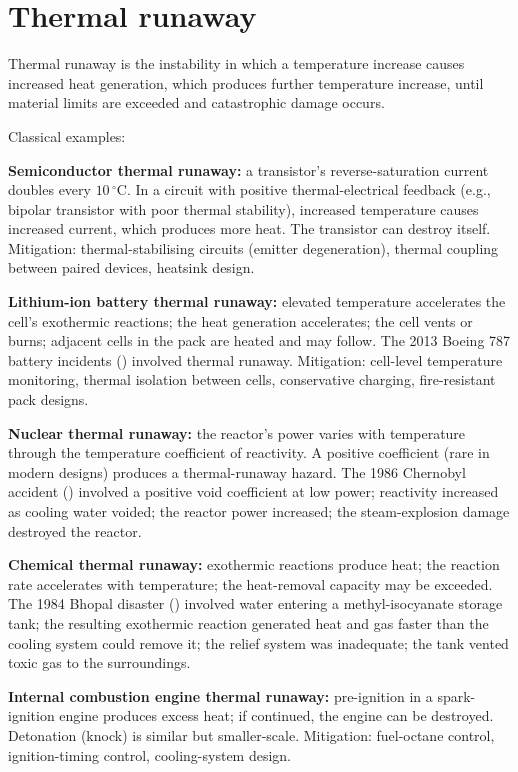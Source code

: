 \section{Thermal runaway}

Thermal runaway is the instability in which a temperature increase causes increased heat generation, which produces further temperature increase, until material limits are exceeded and catastrophic damage occurs.

Classical examples:

\textbf{Semiconductor thermal runaway:} a transistor's reverse-saturation current doubles every $10\,^\circ\text{C}$. In a circuit with positive thermal-electrical feedback (e.g., bipolar transistor with poor thermal stability), increased temperature causes increased current, which produces more heat. The transistor can destroy itself. Mitigation: thermal-stabilising circuits (emitter degeneration), thermal coupling between paired devices, heatsink design.

\textbf{Lithium-ion battery thermal runaway:} elevated temperature accelerates the cell's exothermic reactions; the heat generation accelerates; the cell vents or burns; adjacent cells in the pack are heated and may follow. The 2013 Boeing 787 battery incidents (\cite{acc:ntsb-aar14-01-787-battery}) involved thermal runaway. Mitigation: cell-level temperature monitoring, thermal isolation between cells, conservative charging, fire-resistant pack designs.

\textbf{Nuclear thermal runaway:} the reactor's power varies with temperature through the temperature coefficient of reactivity. A positive coefficient (rare in modern designs) produces a thermal-runaway hazard. The 1986 Chernobyl accident (\cite{acc:iaea-insag7-1992}) involved a positive void coefficient at low power; reactivity increased as cooling water voided; the reactor power increased; the steam-explosion damage destroyed the reactor.

\textbf{Chemical thermal runaway:} exothermic reactions produce heat; the reaction rate accelerates with temperature; the heat-removal capacity may be exceeded. The 1984 Bhopal disaster (\cite{acc:icmr-bhopal-2004}) involved water entering a methyl-isocyanate storage tank; the resulting exothermic reaction generated heat and gas faster than the cooling system could remove it; the relief system was inadequate; the tank vented toxic gas to the surroundings.

\textbf{Internal combustion engine thermal runaway:} pre-ignition in a spark-ignition engine produces excess heat; if continued, the engine can be destroyed. Detonation (knock) is similar but smaller-scale. Mitigation: fuel-octane control, ignition-timing control, cooling-system design.

